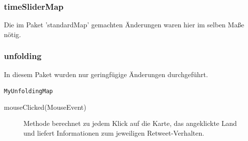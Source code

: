 \subsubsection{timeSliderMap}
Die im Paket 'standardMap' gemachten Änderungen waren hier im selben Maße nötig.

\subsubsection{unfolding} 
In diesem Paket wurden nur geringfügige Änderungen durchgeführt.
\begin{description}
	\item \lstinline{MyUnfoldingMap}
	\begin{description}
			\item[mouseClicked(MouseEvent)] Methode berechnet zu jedem Klick auf die Karte, das angeklickte Land und liefert Informationen zum jeweiligen Retweet-Verhalten.
	\end{description}
\end{description}
	